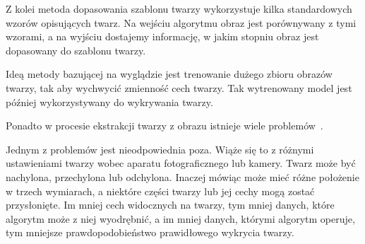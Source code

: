 \documentclass[a4paper,twoside,12pt]{book}
\begin{document}
    Z kolei metoda dopasowania szablonu twarzy wykorzystuje kilka standardowych wzorów opisujących twarz.
    Na wejściu algorytmu obraz jest porównywany z tymi wzorami, a
    na wyjściu dostajemy informację, w jakim stopniu obraz jest dopasowany do szablonu twarzy.

    Ideą metody bazującej na wyglądzie jest trenowanie dużego zbioru obrazów twarzy, tak aby wychwycić zmienność cech
    twarzy.
    Tak wytrenowany model jest później wykorzystywany do wykrywania twarzy.


    Ponadto w procesie ekstrakcji twarzy z obrazu istnieje wiele problemów~\cite{mehdiRizvi}.

    Jednym z problemów jest nieodpowiednia poza.
    Wiąże się to z różnymi ustawieniami twarzy wobec aparatu fotograficznego lub kamery.
    Twarz może być nachylona, przechylona lub odchylona.
    Inaczej mówiąc może mieć różne położenie w trzech wymiarach, a
    niektóre części twarzy lub jej cechy mogą zostać przysłonięte.
    Im mniej cech widocznych na twarzy, tym mniej danych, które algorytm może z niej wyodrębnić, a
    im mniej danych, którymi algorytm operuje, tym mniejsze prawdopodobieństwo prawidłowego wykrycia twarzy.
\end{document}
